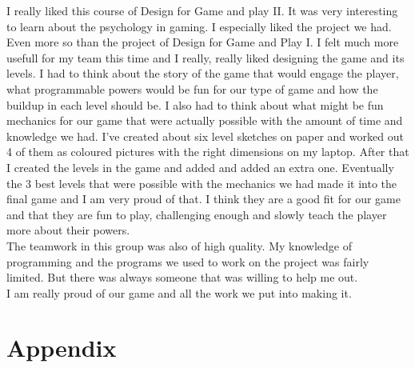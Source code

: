 \documentclass[a4paper,twoside,12pt]{article}
\begin{document}
I really liked this course of Design for Game and play II. It was very interesting to learn about the psychology in gaming. I especially liked the project we had. Even more so than the project of Design for Game and Play I. I felt much more usefull for my team this time and I really, really liked designing the game and its levels. I had to think about the story of the game that would engage the player, what programmable powers would be fun for our type of game and how the buildup in each level should be. I also had to think about what might be fun mechanics for our game that were actually possible with the amount of time and knowledge we had. I've created about six level sketches on paper and worked out 4 of them as coloured pictures with the right dimensions on my laptop. After that I created the levels in the game and added and added an extra one. Eventually the 3 best levels that were possible with the mechanics we had made it into the final game and I am very proud of that. I think they are a good fit for our game and that they are fun to play, challenging enough and slowly teach the player more about their powers.\\
The teamwork in this group was also of high quality. My knowledge of programming and the programs we used to work on the project was fairly limited. But there was always someone that was willing to help me out.\\
I am really proud of our game and all the work we put into making it.

\section{Appendix}
\end{document}
